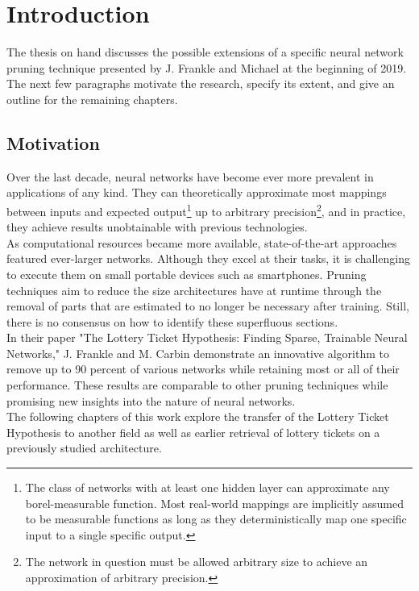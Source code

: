 \chapter{Introduction}
The thesis on hand discusses the possible extensions of a specific neural network pruning technique presented by J. Frankle and Michael at the beginning of 2019.\cite{LTH}\\
The next few paragraphs motivate the research,  specify its extent, and give an outline for the remaining chapters.

\section{Motivation}
Over the last decade, neural networks have become ever more prevalent in applications of any kind. They can theoretically approximate most mappings between inputs and expected output\footnote{The class of networks with at least one hidden layer can approximate any borel-measurable function. Most real-world mappings are implicitly assumed to be measurable functions as long as they deterministically map one specific input to a single specific output.
} up to arbitrary precision\footnote{The network in question must be allowed arbitrary size to achieve an approximation of arbitrary precision.
}\cite{Approximator}, and in practice, they achieve results unobtainable with previous technologies.\\ 
As computational resources became more available, state-of-the-art approaches featured ever-larger networks. Although they excel at their tasks, it is challenging to execute them on small portable devices such as smartphones. Pruning techniques aim to reduce the size architectures have at runtime through the removal of parts that are estimated to no longer be necessary after training. Still, there is no consensus on how to identify these superfluous sections.\\
In their paper "The Lottery Ticket Hypothesis: Finding Sparse, Trainable Neural Networks," J. Frankle and M. Carbin demonstrate an innovative algorithm to remove up to 90 percent of various networks while retaining most or all of their performance. These results are comparable to other pruning techniques while promising new insights into the nature of neural networks.\cite{LTH}
\\
The following chapters of this work explore the transfer of the Lottery Ticket Hypothesis to another field as well as earlier retrieval of lottery tickets on a previously studied architecture.

